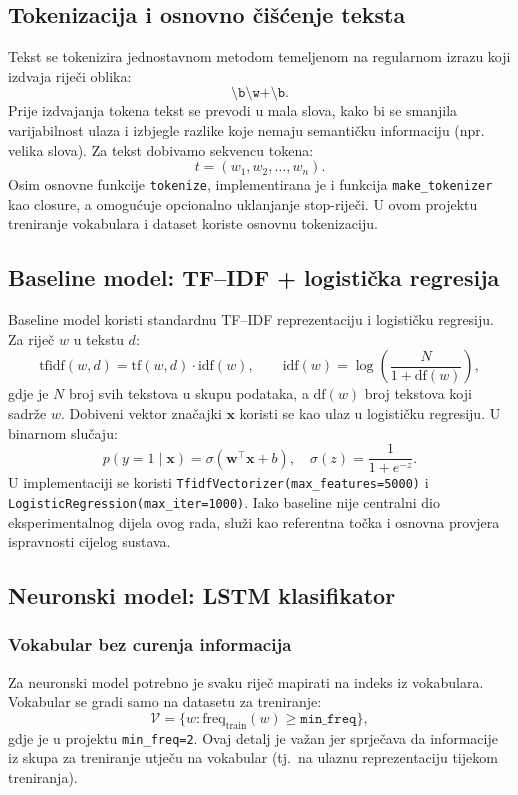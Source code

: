 \documentclass[12pt,a4paper]{article}
\begin{document}
\subsection{Tokenizacija i osnovno čišćenje teksta}
Tekst se tokenizira jednostavnom metodom temeljenom na regularnom izrazu koji izdvaja riječi oblika:
\[
\texttt{\textbackslash b\textbackslash w+\textbackslash b}.
\]
Prije izdvajanja tokena tekst se prevodi u mala slova, kako bi se smanjila varijabilnost ulaza i izbjegle razlike koje nemaju semantičku informaciju (npr. velika slova).
Za tekst dobivamo sekvencu tokena:
\[
t = (w_1, w_2, \ldots, w_n).
\]
Osim osnovne funkcije \texttt{tokenize}, implementirana je i funkcija
\texttt{make\_tokenizer} kao closure, a omogućuje opcionalno uklanjanje stop-riječi. U ovom
projektu treniranje vokabulara i dataset koriste osnovnu tokenizaciju.

\subsection{Baseline model: TF--IDF + logistička regresija}
Baseline model koristi standardnu TF--IDF reprezentaciju i logističku regresiju. Za riječ $w$
u tekstu $d$:
\[
\mathrm{tfidf}(w,d)=\mathrm{tf}(w,d)\cdot \mathrm{idf}(w), \qquad
\mathrm{idf}(w)=\log\left(\frac{N}{1+\mathrm{df}(w)}\right),
\]
gdje je $N$ broj svih tekstova u skupu podataka, a $\mathrm{df}(w)$ broj tekstova koji sadrže $w$.
Dobiveni vektor značajki $\mathbf{x}$ koristi se kao ulaz u logističku regresiju. U binarnom slučaju:
\[
p(y=1\mid \mathbf{x})=\sigma(\mathbf{w}^\top\mathbf{x}+b), \quad
\sigma(z)=\frac{1}{1+e^{-z}}.
\]
U implementaciji se koristi \texttt{TfidfVectorizer(max\_features=5000)} \break i
\texttt{LogisticRegression(max\_iter=1000)}. Iako baseline nije centralni dio eksperimentalnog
dijela ovog rada, služi kao referentna točka i osnovna provjera
ispravnosti cijelog sustava.

\subsection{Neuronski model: LSTM klasifikator}

\subsubsection{Vokabular bez curenja informacija}
Za neuronski model potrebno je svaku riječ mapirati na indeks iz vokabulara. Vokabular se gradi samo na datasetu za treniranje:
\[
\mathcal{V}=\{w:\mathrm{freq}_{\text{train}}(w)\ge \texttt{min\_freq}\},
\]
gdje je u projektu \texttt{min\_freq=2}. Ovaj detalj je važan jer sprječava da informacije iz skupa za treniranje utječu na vokabular (tj.\ na ulaznu reprezentaciju tijekom treniranja).
\end{document}
